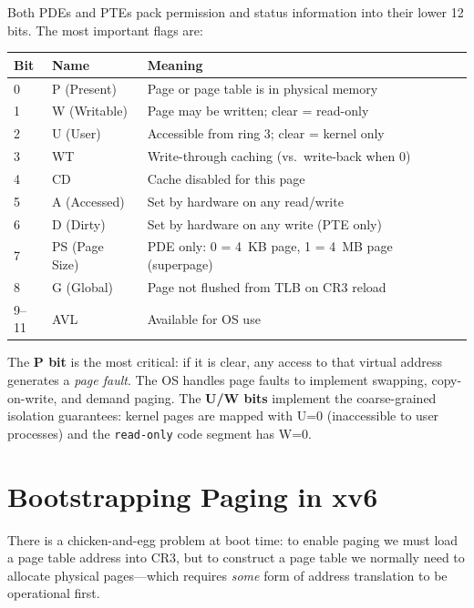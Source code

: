 \documentclass[11pt]{article}
\begin{document}
Both PDEs and PTEs pack permission and status information into their lower 12 bits. The most important flags are:

\begin{center}
\begin{tabular}{lll}
\toprule
\textbf{Bit} & \textbf{Name} & \textbf{Meaning} \\
\midrule
0 & P (Present)       & Page or page table is in physical memory \\
1 & W (Writable)      & Page may be written; clear = read-only \\
2 & U (User)          & Accessible from ring 3; clear = kernel only \\
3 & WT                & Write-through caching (vs.\ write-back when 0) \\
4 & CD                & Cache disabled for this page \\
5 & A (Accessed)      & Set by hardware on any read/write \\
6 & D (Dirty)         & Set by hardware on any write (PTE only) \\
7 & PS (Page Size)    & PDE only: 0 = 4~KB page, 1 = 4~MB page (superpage) \\
8 & G (Global)        & Page not flushed from TLB on CR3 reload \\
9--11 & AVL            & Available for OS use \\
\bottomrule
\end{tabular}
\end{center}

The \textbf{P bit} is the most critical: if it is clear, any access to that virtual address generates a \emph{page fault}. The OS handles page faults to implement swapping, copy-on-write, and demand paging. The \textbf{U/W bits} implement the coarse-grained isolation guarantees: kernel pages are mapped with U=0 (inaccessible to user processes) and the \texttt{read-only} code segment has W=0.

\section{Bootstrapping Paging in xv6}

There is a chicken-and-egg problem at boot time: to enable paging we must load a page table address into CR3, but to construct a page table we normally need to allocate physical pages---which requires \emph{some} form of address translation to be operational first.
\end{document}
